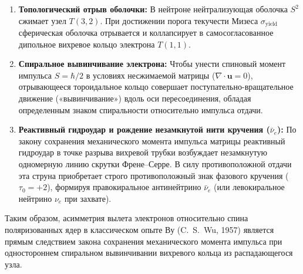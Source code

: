 \documentclass[11pt,a4paper]{article}
\theoremstyle{definition}
\theoremstyle{remark}
\begin{document}
\begin{enumerate}
    \item \textbf{Топологический отрыв оболочки:} В нейтроне нейтрализующая оболочка $S^2$ сжимает узел $T(3,2)$. При достижении порога текучести Мизеса $\sigma_{\mathrm{yield}}$ сферическая оболочка отрывается и коллапсирует в самосогласованное дипольное вихревое кольцо электрона $T(1,1)$.
    
    \item \textbf{Спиральное вывинчивание электрона:} Чтобы унести спиновый момент импульса $S = \hbar/2$ в условиях несжимаемой матрицы ($\nabla \cdot \mathbf{u} = 0$), отрывающееся тороидальное кольцо совершает поступательно-вращательное движение («вывинчивание») вдоль оси пересоединения, обладая определенным знаком спиральности относительно импульса отдачи.
    
    \item \textbf{Реактивный гидроудар и рождение незамкнутой нити кручения ($\bar{\nu}_e$):} По закону сохранения механического момента импульса матрицы реактивный гидроудар в точке разрыва вихревой трубки возбуждает незамкнутую одномерную линию скрутки Френе--Серре. В силу противоположной отдачи эта струна приобретает строго противоположный знак фазового кручения ($\tau_0 = +2$), формируя правокиральное антинейтрино $\bar{\nu}_e$ (или левокиральное нейтрино $\nu_e$ при захвате).
\end{enumerate}

Таким образом, асимметрия вылета электронов относительно спина поляризованных ядер в классическом опыте Ву (C.~S.~Wu, 1957) является прямым следствием закона сохранения механического момента импульса при одностороннем спиральном вывинчивании вихревого кольца из распадающегося узла.
\end{document}

